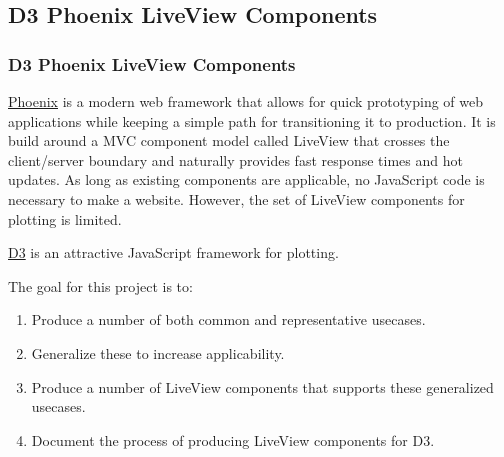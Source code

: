 \subsection{D3 Phoenix LiveView Components}
\begin{frame}
  \frametitle{D3 Phoenix LiveView Components}
  \vspace{0mm}
  \href{https://www.phoenixframework.org/}{Phoenix} is a modern web framework that allows for quick prototyping of web applications while keeping a simple path for transitioning it to production. It is build around a MVC component model called LiveView that crosses the client/server boundary and naturally provides fast response times and hot updates. As long as existing components are applicable, no JavaScript code is necessary to make a website. However, the set of LiveView components for plotting is limited.
  
  \vspace{3mm}
  \href{https://d3js.org/}{D3} is an attractive JavaScript framework for plotting.
  
  \vspace{3mm}
  The goal for this project is to:
  \begin{enumerate}
    \item Produce a number of both common and representative usecases.
    \item Generalize these to increase applicability.
    \item Produce a number of LiveView components that supports these generalized usecases.
    \item Document the process of producing LiveView components for D3.
  \end{enumerate}

\end{frame}

